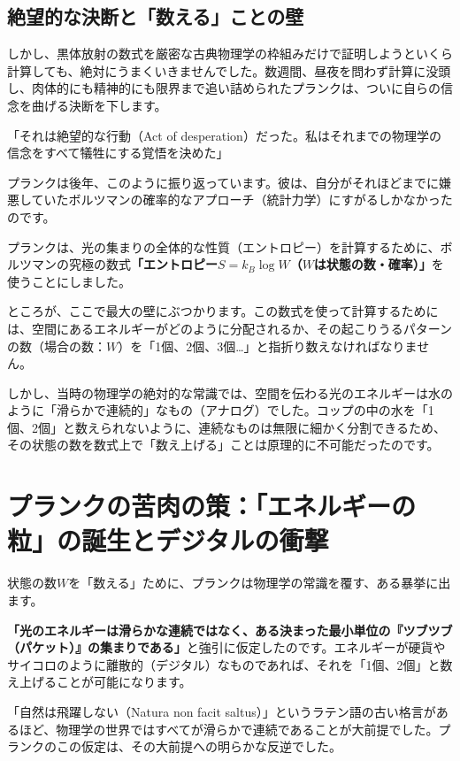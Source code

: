 \subsection{絶望的な決断と「数える」ことの壁}

しかし、黒体放射の数式を厳密な古典物理学の枠組みだけで証明しようといくら計算しても、絶対にうまくいきませんでした。数週間、昼夜を問わず計算に没頭し、肉体的にも精神的にも限界まで追い詰められたプランクは、ついに自らの信念を曲げる決断を下します。

「それは絶望的な行動（Act of desperation）だった。私はそれまでの物理学の信念をすべて犠牲にする覚悟を決めた」

プランクは後年、このように振り返っています。彼は、自分がそれほどまでに嫌悪していたボルツマンの確率的なアプローチ（統計力学）にすがるしかなかったのです。

プランクは、光の集まりの全体的な性質（エントロピー）を計算するために、ボルツマンの究極の数式\textbf{「エントロピー\(S = k_B \log W\)（\(W\)は状態の数・確率）」}を使うことにしました。

ところが、ここで最大の壁にぶつかります。この数式を使って計算するためには、空間にあるエネルギーがどのように分配されるか、その起こりうるパターンの数（場合の数：\(W\)）を「1個、2個、3個\ldots{}」と指折り数えなければなりません。

しかし、当時の物理学の絶対的な常識では、空間を伝わる光のエネルギーは水のように「滑らかで連続的」なもの（アナログ）でした。コップの中の水を「1個、2個」と数えられないように、連続なものは無限に細かく分割できるため、その状態の数を数式上で「数え上げる」ことは原理的に不可能だったのです。

\section{プランクの苦肉の策：「エネルギーの粒」の誕生とデジタルの衝撃}

状態の数\(W\)を「数える」ために、プランクは物理学の常識を覆す、ある暴挙に出ます。

\textbf{「光のエネルギーは滑らかな連続ではなく、ある決まった最小単位の『ツブツブ（パケット）』の集まりである」}と強引に仮定したのです。エネルギーが硬貨やサイコロのように離散的（デジタル）なものであれば、それを「1個、2個」と数え上げることが可能になります。

「自然は飛躍しない（Natura non facit saltus）」というラテン語の古い格言があるほど、物理学の世界ではすべてが滑らかで連続であることが大前提でした。プランクのこの仮定は、その大前提への明らかな反逆でした。

